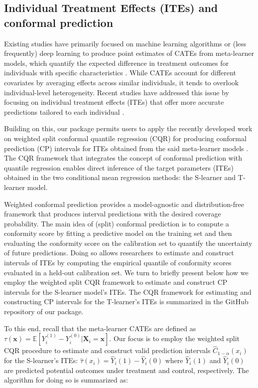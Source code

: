 \subsection{Individual Treatment Effects (ITEs) and conformal prediction}\label{individual-treatment-effects-ites-and-conformal-prediction}

Existing studies have primarily focused on machine learning algorithms
or (less frequently) deep learning to produce point estimates of CATEs
from meta-learner models, which quantify the expected difference in
treatment outcomes for individuals with specific characteristics
\citep{Wager2019estimation, Kunzel2019meta}. While CATEs account for
different covariates by averaging effects across similar individuals, it
tends to overlook individual-level heterogeneity. Recent studies have
addressed this issue by focusing on individual treatment effects (ITEs)
that offer more accurate predictions tailored to each individual
\citep{alaa2018limits}.

Building on this, our package permits users to apply the recently
developed work on weighted split conformal quantile regression (CQR) for
producing conformal prediction (CP) intervals for ITEs obtained from the
said meta-learner models \citep{Lei2021conformal, Alaa2023conformal}. The
CQR framework that integrates the concept of conformal prediction with
quantile regression enables direct inference of the target parameters
(ITEs) obtained in the two conditional mean regression methods: the
S-learner and T-learner model.

Weighted conformal prediction provides a model-agnostic and
distribution-free framework that produces interval predictions with the
desired coverage probability. The main idea of (split) conformal
prediction is to compute a conformity score by fitting a predictive
model on the training set and then evaluating the conformity score on
the calibration set to quantify the uncertainty of future predictions.
Doing so allows researchers to estimate and construct intervals of ITEs
by computing the empirical quantile of conformity scores evaluated in a
held-out calibration set. We turn to briefly present below how we employ
the weighted split CQR framework to estimate and construct CP intervals
for the S-learner model's ITEs. The CQR framework for estimating and
constructing CP intervals for the T-learner's ITEs is summarized in the
GitHub repository of our package.

To this end, recall that the meta-learner CATEs are defined as
\(\tau\left(\mathbf{x}\right)=\mathbb{E}\left[Y_{i}^{\left(1\right)}-Y_{i}^{\left(0\right)}|{\mathbf{X}_{i}}=\mathbf{x}\right]\).
Our focus is to employ the weighted split CQR procedure to estimate and
construct valid prediction intervals \(\widehat{C}_{1-\alpha}(x_{i})\) for
the S-learner's ITEs:
\(\widehat{\tau}(x_{i})=\widehat{Y}_{i}(1)-\widehat{Y}_{i}(0)\) where
\(\widehat{Y}_{i}(1)\) and \(\widehat{Y}_{i}(0)\) are predicted potential
outcomes under treatment and control, respectively. The algorithm for
doing so is summarized as:

